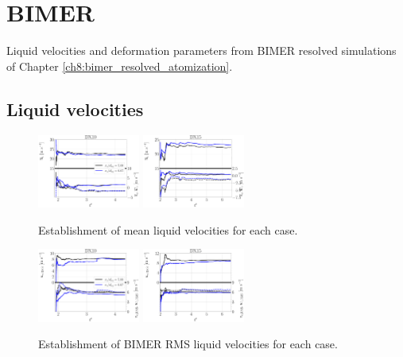 \clearpage


\section{BIMER}


Liquid velocities and deformation parameters from BIMER resolved simulations of Chapter \ref{ch8:bimer_resolved_atomization}.


\subsection*{Liquid velocities}

\begin{figure}[ht]
	\centering
   \includegraphics[width=0.3\textwidth]{./part3_applications/figures_ch8_resolved/SPRAY_characterization/velocities/establishment_DX10_mean}
   \includegraphics[width=0.3\textwidth]{./part3_applications/figures_ch8_resolved/SPRAY_characterization/velocities/establishment_DX15_mean}
   \caption{Establishment of mean liquid velocities for each case.}
\label{fig:app_BIMER_spray_velocities_establishment_mean}
\end{figure}

\vspace*{0.2in}

\begin{figure}[ht]
	\centering
   \includegraphics[width=0.3\textwidth]{./part3_applications/figures_ch8_resolved/SPRAY_characterization/velocities/establishment_DX10_rms}
   \includegraphics[width=0.3\textwidth]{./part3_applications/figures_ch8_resolved/SPRAY_characterization/velocities/establishment_DX15_rms}
   \caption{Establishment of BIMER RMS liquid velocities for each case.}
\label{fig:app_BIMER_spray_velocities_establishment_rms}
\end{figure}

